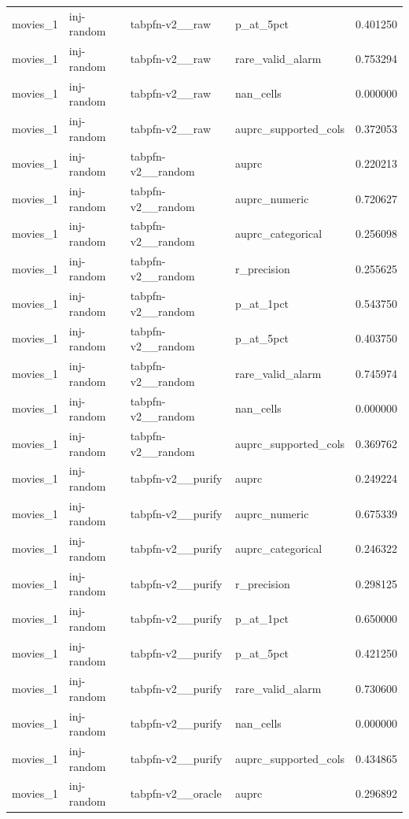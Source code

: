\begin{tabular}{lllll}
movies\_1 & inj-random & tabpfn-v2\_\_raw & p\_at\_5pct & 0.401250 \\
movies\_1 & inj-random & tabpfn-v2\_\_raw & rare\_valid\_alarm & 0.753294 \\
movies\_1 & inj-random & tabpfn-v2\_\_raw & nan\_cells & 0.000000 \\
movies\_1 & inj-random & tabpfn-v2\_\_raw & auprc\_supported\_cols & 0.372053 \\
movies\_1 & inj-random & tabpfn-v2\_\_random & auprc & 0.220213 \\
movies\_1 & inj-random & tabpfn-v2\_\_random & auprc\_numeric & 0.720627 \\
movies\_1 & inj-random & tabpfn-v2\_\_random & auprc\_categorical & 0.256098 \\
movies\_1 & inj-random & tabpfn-v2\_\_random & r\_precision & 0.255625 \\
movies\_1 & inj-random & tabpfn-v2\_\_random & p\_at\_1pct & 0.543750 \\
movies\_1 & inj-random & tabpfn-v2\_\_random & p\_at\_5pct & 0.403750 \\
movies\_1 & inj-random & tabpfn-v2\_\_random & rare\_valid\_alarm & 0.745974 \\
movies\_1 & inj-random & tabpfn-v2\_\_random & nan\_cells & 0.000000 \\
movies\_1 & inj-random & tabpfn-v2\_\_random & auprc\_supported\_cols & 0.369762 \\
movies\_1 & inj-random & tabpfn-v2\_\_purify & auprc & 0.249224 \\
movies\_1 & inj-random & tabpfn-v2\_\_purify & auprc\_numeric & 0.675339 \\
movies\_1 & inj-random & tabpfn-v2\_\_purify & auprc\_categorical & 0.246322 \\
movies\_1 & inj-random & tabpfn-v2\_\_purify & r\_precision & 0.298125 \\
movies\_1 & inj-random & tabpfn-v2\_\_purify & p\_at\_1pct & 0.650000 \\
movies\_1 & inj-random & tabpfn-v2\_\_purify & p\_at\_5pct & 0.421250 \\
movies\_1 & inj-random & tabpfn-v2\_\_purify & rare\_valid\_alarm & 0.730600 \\
movies\_1 & inj-random & tabpfn-v2\_\_purify & nan\_cells & 0.000000 \\
movies\_1 & inj-random & tabpfn-v2\_\_purify & auprc\_supported\_cols & 0.434865 \\
movies\_1 & inj-random & tabpfn-v2\_\_oracle & auprc & 0.296892 \\

\end{tabular}
